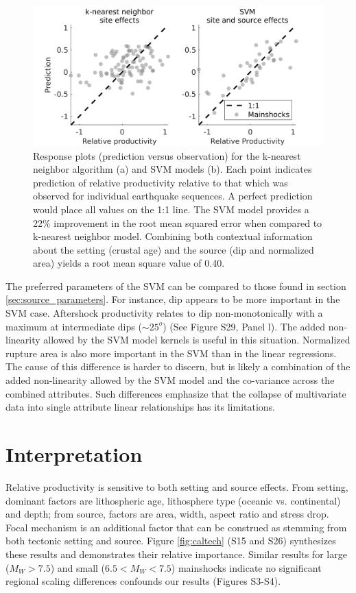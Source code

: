 \documentclass[draft, jgrga]{agujournal2018}
\begin{document}
    \begin{figure}
        \centering
        \includegraphics{response.png}
        \caption{Response plots (prediction versus observation) for the k-nearest neighbor algorithm (a) and SVM models (b). Each point indicates prediction of relative productivity relative to that which was observed for individual earthquake sequences. A perfect prediction would place all values on the 1:1 line. The SVM model provides a 22\% improvement in the root mean squared error when compared to k-nearest neighbor model. Combining both contextual information about the setting (crustal age) and the source (dip and normalized area) yields a root mean square value of 0.40.}
        \label{fig:response}
    \end{figure}

The preferred parameters of the SVM can be compared to those found in section \ref{sec:source_parameters}. For instance, dip appears to be more important in the SVM case. Aftershock productivity relates to dip non-monotonically with a maximum at intermediate  dips ($\sim 25^o$) (See Figure S29, Panel l). The added non-linearity allowed by the SVM model kernels is useful in this situation. Normalized rupture area is also more important in the SVM than in the linear regressions. The cause of this difference is harder to discern, but is likely a combination of the added non-linearity allowed by the SVM model and the co-variance across the combined attributes. Such differences emphasize that the collapse of multivariate data into single attribute linear relationships has its limitations.

\section{Interpretation}

Relative productivity is sensitive to both setting and source effects. From setting, dominant factors are lithospheric age, lithosphere type (oceanic vs. continental) and depth; from source, factors are area, width, aspect ratio and stress drop. Focal mechanism is an additional factor that can be construed as stemming from both tectonic setting and source. Figure \ref{fig:caltech} (S15 and S26) synthesizes these results and demonstrates their relative importance. Similar results for large ($M_W>7.5$) and small ($6.5<M_W<7.5$) mainshocks indicate no significant regional scaling differences confounds our results (Figures S3-S4).
\end{document}
